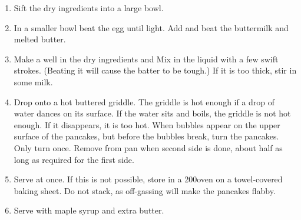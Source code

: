 
\begin{ingredients}
\end{ingredients}


\begin{recipe}
  \begin{enumerate}

  \item Sift the dry ingredients into a large bowl.

  \item In a smaller bowl beat the egg until light.  Add and beat the
    buttermilk and melted butter.

  \item Make a well in the dry ingredients and Mix in the liquid with
    a few swift strokes.  (Beating it will cause the batter to be
    tough.)  If it is too thick, stir in some milk.

  \item Drop onto a hot buttered griddle.  The griddle is hot enough
    if a drop of water dances on its surface.  If the water sits and
    boils, the griddle is not hot enough.  If it disappears, it is too
    hot.  When bubbles appear on the upper surface of the pancakes,
    but before the bubbles break, turn the pancakes.  Only turn once.
    Remove from pan when second side is done, about half as long as
    required for the first side.

  \item Serve at once.  If this is not possible, store in a 200\F oven
    on a towel-covered baking sheet.  Do not stack, as off-gassing
    will make the pancakes flabby.

  \item Serve with maple syrup and extra butter.

  \end{enumerate}
\end{recipe}
